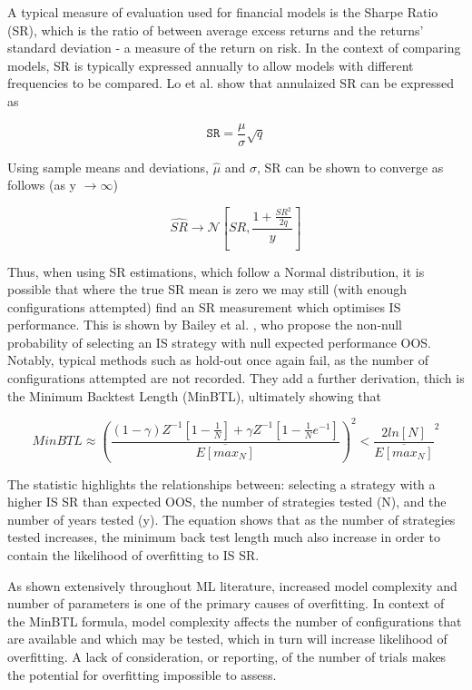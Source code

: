 \documentclass[a4paper,11pt,oneside]{article}
\theoremstyle{plain}
\theoremstyle{definition}
\begin{document}
A typical measure of evaluation used for financial models is the Sharpe Ratio (SR), which is the ratio of between 
average excess returns and the returns’ standard deviation - a measure of the return on risk. In the context of 
comparing models, SR is typically expressed annually to allow models with different frequencies to be compared. 
Lo et al. \cite{Lo} show that annulaized SR can be expressed as

\begin{equation}\label{SRAnnual}
\texttt{SR}=\frac{\mu}{\sigma}\sqrt{q}
\end{equation}

Using sample means and deviations, $\hat{\mu}$ and $\hat{\sigma}$, SR can be shown to converge as follows 
(as y $\rightarrow\infty$)

\begin{equation}\label{SRConvergence}
  \hat{SR}  \rightarrow \mathcal {N} [SR,\frac{1 + \frac{SR^2}{2q}}{y}]
\end{equation}

Thus, when using SR estimations, which follow a Normal distribution, it is possible that where the true SR mean is 
zero we may still (with enough configurations attempted) find an SR measurement which optimises IS performance. 
This is shown by Bailey et al. \cite{BaileyBTL}, who propose the non-null probability of selecting an IS strategy with null expected 
performance OOS. Notably, typical methods such as hold-out once again fail, as the number of configurations 
attempted are not recorded. They add a further derivation, thich is the Minimum Backtest Length (MinBTL), ultimately 
showing that

\begin{equation}\label{MinBTL}
MinBTL \approx (\frac{
                                  (1-\gamma)Z^{-1}[1-\frac{1}{N}] + \gamma Z^{-1}[1 -\frac{1}{N}e^{-1}]}
                                  {\overline{E[max_N]}})^2
                                  < \frac{2ln[N]}{\overline{E[max_N]}}^2
\end{equation}

The statistic highlights the relationships between: selecting a strategy with a higher IS SR than expected OOS, 
the number of strategies tested (N), and the number of years tested (y). The equation shows that  as the number 
of strategies tested increases, the minimum back test length much also increase in order to contain the likelihood 
of overfitting to IS SR. 
\hfill \break 

As shown extensively throughout ML literature, increased model complexity and number of parameters is one of 
the primary causes of overfitting. In context of the MinBTL formula, model complexity affects the number of 
configurations that are available and which may be tested, which in turn will increase likelihood of overfitting. 
A lack of consideration, or reporting, of the number of trials makes the potential for overfitting impossible to assess. 
\hfill \break 
\end{document}
